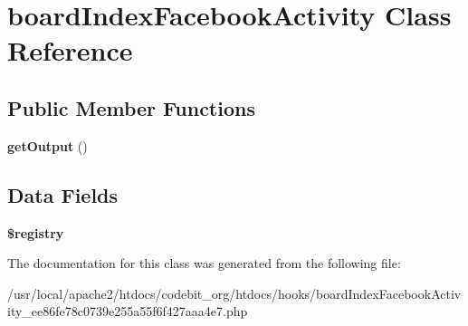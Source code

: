 \hypertarget{classboard_index_facebook_activity}{\section{board\-Index\-Facebook\-Activity Class Reference}
\label{classboard_index_facebook_activity}
}
\subsection*{Public Member Functions}
\begin{DoxyCompactItemize}
\item 
\hypertarget{classboard_index_facebook_activity_aefad4c11248b7c6fa6581c25d82bf9c6}{{\bfseries get\-Output} ()}\label{classboard_index_facebook_activity_aefad4c11248b7c6fa6581c25d82bf9c6}

\end{DoxyCompactItemize}
\subsection*{Data Fields}
\begin{DoxyCompactItemize}
\item 
\hypertarget{classboard_index_facebook_activity_a531e4a386aaa7f3e06d3642dc38d7e80}{{\bfseries \$registry}}\label{classboard_index_facebook_activity_a531e4a386aaa7f3e06d3642dc38d7e80}

\end{DoxyCompactItemize}


The documentation for this class was generated from the following file\-:\begin{DoxyCompactItemize}
\item 
/usr/local/apache2/htdocs/codebit\-\_\-org/htdocs/hooks/board\-Index\-Facebook\-Activity\-\_\-ee86fe78c0739e255a55f6f427aaa4e7.\-php\end{DoxyCompactItemize}
